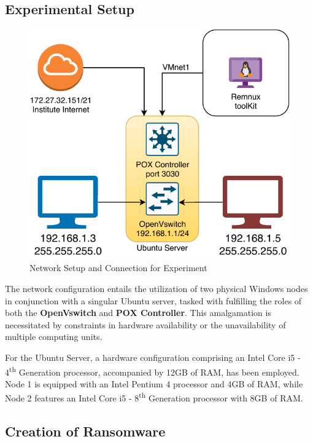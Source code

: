 \documentclass[12pt,letterpaper]{article}
\begin{document}
            
        \subsection{Experimental Setup}

        \begin{figure}[htt]
            \centering
            \includegraphics{images/NetworkSetip.drawio.pdf}
            \caption{Network Setup and Connection for Experiment}
            \label{fig:Network Setup and Connection for Experiment}
        \end{figure}

        The network configuration entails the utilization of two physical Windows nodes in conjunction with a singular Ubuntu server, tasked with fulfilling the roles of both the \textbf{OpenVswitch} and \textbf{POX Controller}. This amalgamation is necessitated by constraints in hardware availability or the unavailability of multiple computing units.

        For the Ubuntu Server, a hardware configuration comprising an Intel Core i5 - 4\textsuperscript{th} Generation processor, accompanied by 12GB of RAM, has been employed. Node 1 is equipped with an Intel Pentium 4 processor and 4GB of RAM, while Node 2 features an Intel Core i5 - 8\textsuperscript{th} Generation processor with 8GB of RAM.


        \subsection{Creation of Ransomware}
\end{document}
